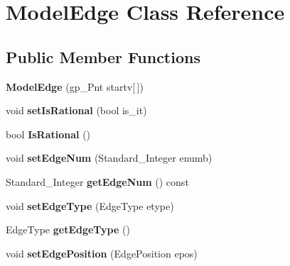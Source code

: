 \hypertarget{classModelEdge}{\section{Model\-Edge Class Reference}
\label{classModelEdge}
}
\subsection*{Public Member Functions}
\begin{DoxyCompactItemize}
\item 
\hypertarget{classModelEdge_a0663679e1a3462593bb2cec05f8a052f}{{\bfseries Model\-Edge} (gp\-\_\-\-Pnt startv\mbox{[}$\,$\mbox{]})}\label{classModelEdge_a0663679e1a3462593bb2cec05f8a052f}

\item 
\hypertarget{classModelEdge_a953b7fcf296b5dd3703780baf0ded2be}{void {\bfseries set\-Is\-Rational} (bool is\-\_\-it)}\label{classModelEdge_a953b7fcf296b5dd3703780baf0ded2be}

\item 
\hypertarget{classModelEdge_af452e2f9b781288175da8e8fc6a6b3b6}{bool {\bfseries Is\-Rational} ()}\label{classModelEdge_af452e2f9b781288175da8e8fc6a6b3b6}

\item 
\hypertarget{classModelEdge_a42f6669f57658d404afbfdabc3785078}{void {\bfseries set\-Edge\-Num} (Standard\-\_\-\-Integer enumb)}\label{classModelEdge_a42f6669f57658d404afbfdabc3785078}

\item 
\hypertarget{classModelEdge_ac4165c644c04eb07e00319fdcab4badf}{Standard\-\_\-\-Integer {\bfseries get\-Edge\-Num} () const }\label{classModelEdge_ac4165c644c04eb07e00319fdcab4badf}

\item 
\hypertarget{classModelEdge_a2e938d40d28bf46e21cf536fd79ec534}{void {\bfseries set\-Edge\-Type} (Edge\-Type etype)}\label{classModelEdge_a2e938d40d28bf46e21cf536fd79ec534}

\item 
\hypertarget{classModelEdge_a5acee2e41d8937d2634b4df9983740c5}{Edge\-Type {\bfseries get\-Edge\-Type} ()}\label{classModelEdge_a5acee2e41d8937d2634b4df9983740c5}

\item 
\hypertarget{classModelEdge_aff4e68680c30a39f581adb5691d44148}{void {\bfseries set\-Edge\-Position} (Edge\-Position epos)}\label{classModelEdge_aff4e68680c30a39f581adb5691d44148}


\end{DoxyCompactItemize}

